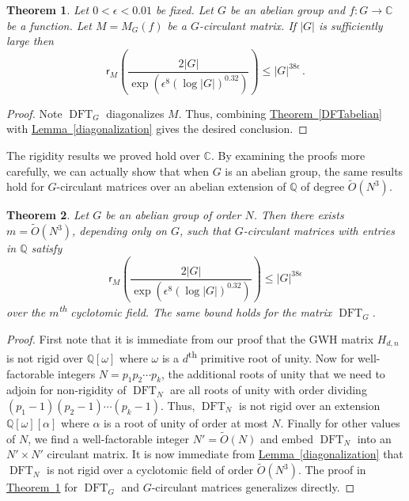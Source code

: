 \documentclass[11pt]{article}
\numberwithin{equation}{section}
\newtheorem{theorem}{Theorem}[section]
\theoremstyle{definition}
\theoremstyle{plain}
\newcommand{\C}{\mathbb C}
\newcommand{\Q}{\mathbb Q}
\newcommand{\expref}[2]{\hyperref[#2]{#1~\ref{#2}}}
\theoremstyle{definition}
\renewcommand\Q{{\mathbb{Q}}}
\renewcommand\C{{\mathbb{C}}}
\newcommand{\ts}{\textsuperscript}
\DeclareMathOperator{\DFT}{DFT}
\begin{document}
\begin{theorem}\label{allabelian}
  Let $0 < \epsilon < 0.01$ be fixed.  Let $G$ be an abelian group and $f: G \rightarrow \C$ be a function. Let $M = M_G(f)$ be a %
$G$-circulant matrix.  If $|G|$ is sufficiently large then
\[
\textsf{r}_M\left(\frac{2|G|}{\exp\left(\epsilon^8 (\log |G|)^{0.32}\right)} \right) \leq |G|^{38 \epsilon} \,.
\]
\end{theorem}
\begin{proof}

Note $\DFT_G$ diagonalizes $M$.  Thus, combining \expref{Theorem}{DFTabelian}
with  \expref{Lemma}{diagonalization} gives the
%
desired conclusion.
\end{proof}


%
The rigidity results we proved hold over $\C$.  By examining the proofs more carefully, we can actually show that when $G$ is an abelian group, the same results hold for $G$-circulant matrices over an
%
abelian   %
extension of $\Q$ of degree $\tilde{O}(N^3)$.
\begin{theorem}\label{thm:extension_degree}
Let $G$ be an abelian group of order $N$.  Then there exists $m = \tilde{O}(N^3)$, depending only on $G$, such that $G$-circulant matrices with entries in $\Q$ satisfy
\[
\textsf{r}_M\left(\frac{2|G|}{\exp\left(\epsilon^8 (\log |G|)^{0.32}\right)} \right) \leq |G|^{38 \epsilon}
\]
over the $m$\ts{th} cyclotomic field.  The same bound holds for the matrix $\DFT_G$.
\end{theorem}
\begin{proof}
First note that it is immediate from our proof that the GWH matrix $H_{d,n}$ is not rigid over $\Q[\omega]$ where $\omega$ is a
$d$\ts{th}  %
primitive root of unity. 
%
Now for well-factorable integers $N = p_1p_2 \cdots p_k$, the additional roots of unity that we need to adjoin for non-rigidity of $\DFT_N$ are all roots of unity with order dividing $(p_1-1)(p_2-1) \cdots (p_k - 1)$.  Thus, $\DFT_N$ is not rigid over an extension $\Q[\omega][\alpha]$ where $\alpha$
%
is a root of unity of order at most $N$.  %
Finally for other values of $N$, we find a well-factorable integer $N' = \tilde{O}(N)$ and embed $\DFT_N$ into an $N' \times  N'$ circulant matrix.  It is now immediate from \expref{Lemma}{diagonalization} that $\DFT_N$ is not rigid over a cyclotomic field of order $\tilde{O}(N^3)$.  The proof in \expref{Theorem}{allabelian} for  $\DFT_G$ and $G$-circulant matrices generalizes directly.  
\end{proof}
%
\end{document}
